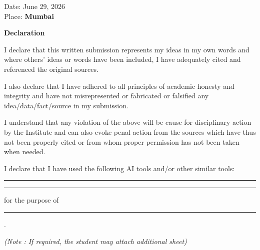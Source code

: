 \documentclass[12pt,oneside]{book}
\begin{document}
\vfill
\noindent Date: June 29, 2026\\
Place: \textbf{Mumbai}


\clearpage
\thispagestyle{empty}
\begin{center}
{\Large\bfseries Declaration}
\end{center}
\vspace{0.8cm}

\noindent\hspace{1cm}I declare that this written submission represents my ideas in my own words and where others' ideas or words have been included, I have adequately cited and referenced the original sources.

\vspace{0.4cm}
\noindent\hspace{1cm}I also declare that I have adhered to all principles of academic honesty and integrity and have not misrepresented or fabricated or falsified any idea/data/fact/source in my submission.

\vspace{0.4cm}
\noindent\hspace{1cm}I understand that any violation of the above will be cause for disciplinary action by the Institute and can also evoke penal action from the sources which have thus not been properly cited or from whom proper permission has not been taken when needed.

\vspace{0.4cm}
\noindent\hspace{1cm}I declare that I have used the following AI tools and/or other similar tools:

\vspace{0.5cm}
\noindent\rule{\textwidth}{0.4pt}

\vspace{0.5cm}
\noindent\rule{\textwidth}{0.4pt}

\vspace{0.5cm}
\noindent for the purpose of \underline{\hspace{10cm}}

\vspace{0.5cm}
\noindent\rule{\textwidth}{0.4pt}.

\vspace{0.3cm}
\noindent\textit{(Note : If required, the student may attach additional sheet)}
\end{document}
